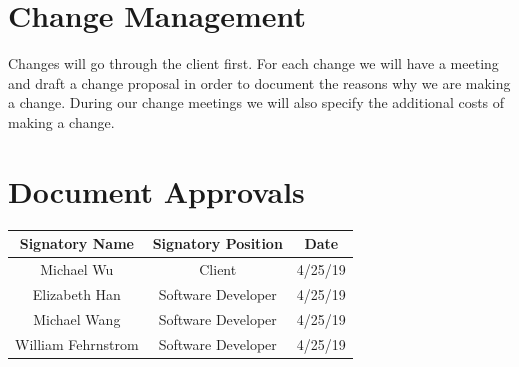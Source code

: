 \documentclass[12pt]{article}
\begin{document}
\section{Change Management}

Changes will go through the client first. For each change we will have a meeting and
draft a change proposal in order to document the reasons why we are making a change. During
our change meetings we will also specify the additional costs of making a change.

\section{Document Approvals}

\begin{center}
    \begin{tabular}{|c|c|c|}
        \hline
        Signatory Name & Signatory Position & Date \\ \hline
        Michael Wu & Client & 4/25/19 \\ \hline
        Elizabeth Han & Software Developer & 4/25/19 \\ \hline
        Michael Wang & Software Developer & 4/25/19 \\ \hline
        William Fehrnstrom & Software Developer & 4/25/19 \\ \hline
    \end{tabular}
\end{center}
\end{document}

